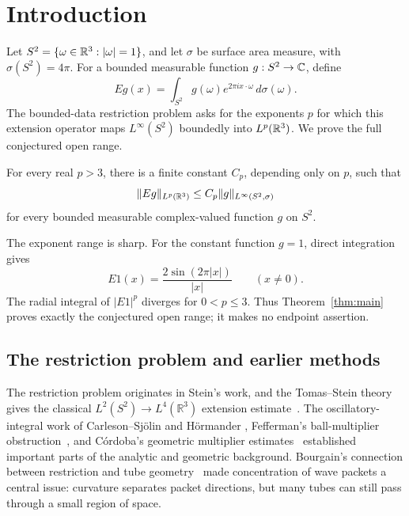 \begin{abstract}
We prove the bounded-data Fourier restriction conjecture for the sphere in
three dimensions: the Fourier extension operator maps $L^\infty(S^2)$
boundedly into $L^p(\R^3)$ for every $p>3$. This is the full conjectured
open range, and the threshold $p=3$ is sharp.
\end{abstract}

\section{Introduction}
\label{sec:introduction}

Let \(S^2=\{\omega\in\mathbb R^3:|\omega|=1\}\), and let \(\sigma\) be surface
area measure, with \(\sigma(S^2)=4\pi\). For a bounded measurable
function \(g:S^2\to\mathbb C\), define
\[
  Eg(x)=\int_{S^2}g(\omega)e^{2\pi i x\cdot\omega}\,d\sigma(\omega).
\]
The bounded-data restriction problem asks for the exponents $p$ for which
this extension operator maps $L^\infty(S^2)$ boundedly into
$L^p(\R^3)$. We prove the full conjectured open range.

\begin{theorem}\label{thm:main}
For every real \(p>3\), there is a finite constant \(C_p\), depending
only on \(p\), such that
\[
  \|Eg\|_{L^p(\mathbb R^3)}
  \le C_p\|g\|_{L^\infty(S^2,\sigma)}
\]
for every bounded measurable complex-valued function \(g\) on \(S^2\).
\end{theorem}

The exponent range is sharp. For the constant function \(g=1\),
direct integration gives
\[
  E1(x)=\frac{2\sin(2\pi |x|)}{|x|}\qquad (x\ne0).
\]
The radial integral of \(|E1|^p\) diverges for \(0<p\le3\).
Thus Theorem~\ref{thm:main} proves exactly the conjectured open range;
it makes no endpoint assertion.

\subsection{The restriction problem and earlier methods}

The restriction problem originates in Stein's work, and the
Tomas--Stein theory gives the classical $L^2(S^2)\to L^4(\mathbb R^3)$
extension estimate~\cite{Stein1979,Tomas1975,Tomas1979}.
The oscillatory-integral work of Carleson--Sj\"olin and H\"ormander
\cite{CarlesonSjolin1972,Hormander1973}, Fefferman's ball-multiplier
obstruction~\cite{Fefferman1971}, and C\'ordoba's geometric multiplier
estimates~\cite{Cordoba1975} established important parts of the
analytic and geometric background. Bourgain's connection between
restriction and tube geometry~\cite{Bourgain1991Besicovitch} made
concentration of wave packets a central issue: curvature separates
packet directions, but many tubes can still pass through a small
region of space.

